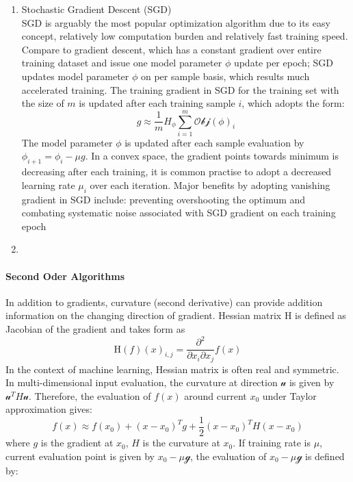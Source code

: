 \begin{enumerate}
    \item Stochastic Gradient Descent (SGD)\\
SGD is arguably the most popular optimization algorithm due to its easy concept, relatively low computation burden and relatively fast training speed. Compare to gradient descent, which has a constant gradient over entire training dataset and issue one  model parameter $\phi$ update per epoch; SGD updates model parameter $\phi$ on per sample basis, which results much accelerated training. The training gradient in SGD for the training set with the size of $m$ is updated after each training sample $i$, which adopts the form: 
\begin{equation}
    g \approx \frac{1}{m}H_{\phi}\sum_{i=1}^m\mathcal{Obj}(\phi)_i
\end{equation}
The model parameter $\phi$ is updated after each sample evaluation by $\phi_{i+1} = \phi_i - \mu g$. In a convex space, the gradient points towards minimum is decreasing after each training, it is common practise to adopt a decreased learning rate $\mu_i$ over each iteration. Major benefits by adopting vanishing gradient in SGD include: preventing overshooting the optimum and combating systematic noise associated with SGD  
gradient on each training epoch 
    \item \\
\end{enumerate}

\paragraph{Second Oder Algorithms}
In addition to gradients, curvature (second derivative) can provide addition information on the changing direction of gradient. Hessian matrix $\mathrm{H}$ is defined as Jacobian of the gradient and takes form as 
\begin{equation}
    \mathrm{H}(f)(x)_{i,j} = \frac{\partial^2}{\partial x_i \partial x_j}f(x)
\end{equation}
In the context of machine learning, Hessian matrix is often real and symmetric. In multi-dimensional input evaluation, the curvature at direction $\mathcal{u}$ is given by $\mathcal{u}^TH\mathcal{u}$. Therefore, the evaluation of $f(x)$ around current $x_0$ under Taylor approximation gives:
\begin{equation}
    \label{eq:TaylorEvaluation}
    f(x) \approx f(x_0)+(x-x_0)^Tg+\frac{1}{2}(x-x_0)^TH(x-x_0)
\end{equation}
where $g$ is the gradient at $x_0$, $H$ is the curvature at $x_0$. If training rate is $\mu$, current evaluation point is given by $x_0-\mu\mathcal{g}$, the evaluation of $x_0-\mu\mathcal{g}$ is defined by:

